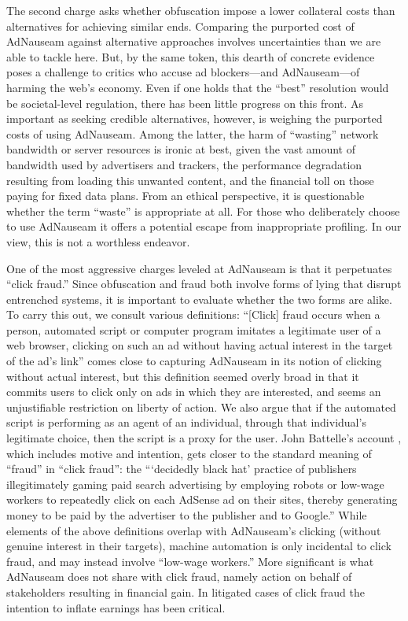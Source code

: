 \documentclass[conference]{IEEEtran}
\begin{document}
The second charge asks whether obfuscation impose a lower collateral costs than alternatives for achieving similar ends. Comparing the purported cost of AdNauseam against alternative approaches involves uncertainties than we are able to tackle here. But, by the same token, this dearth of concrete evidence poses a challenge to critics who accuse ad blockers---and AdNauseam---of harming the web's economy. Even if one holds that the “best” resolution would be societal-level regulation, there has been little progress on this front. As important as seeking credible alternatives, however, is weighing the purported costs of using AdNauseam. Among the latter, the harm of “wasting” network bandwidth or server resources is ironic at best, given the vast amount of bandwidth used by advertisers and trackers, the performance degradation resulting from loading this unwanted content, and the financial toll on those paying for fixed data plans. From an ethical perspective, it is questionable whether the term “waste” is appropriate at all. For those who deliberately choose to use AdNauseam it offers a potential escape from inappropriate profiling. In our view, this is not a worthless endeavor.

One of the most aggressive charges leveled at AdNauseam is that it perpetuates “click fraud.” Since obfuscation and fraud both involve forms of lying that disrupt entrenched systems, it is important to evaluate whether the two forms are alike. To carry this out, we consult various definitions: “[Click] fraud occurs when a person, automated script or computer program imitates a legitimate user of a web browser, clicking on such an ad without having actual interest in the target of the ad's link” \cite{Liu} comes close to capturing AdNauseam in its notion of clicking without actual interest, but this definition seemed overly broad in that it commits users to click only on ads in which they are interested, and seems an unjustifiable restriction on liberty of action. We also argue that if the automated script is performing as an agent of an individual, through that individual's legitimate choice, then the script is a proxy for the user. John Battelle's account \cite{Battelle}, which includes motive and intention, gets closer to the standard meaning of “fraud” in “click fraud”: the “‘decidedly black hat’ practice of publishers illegitimately gaming paid search advertising by employing robots or low-wage workers to repeatedly click on each AdSense ad on their sites, thereby generating money to be paid by the advertiser to the publisher and to Google.” While elements of the above definitions overlap with AdNauseam's clicking (without genuine interest in their targets), machine automation is only incidental to click fraud, and may instead involve “low-wage workers.” More significant is what AdNauseam does not share with click fraud, namely action on behalf of stakeholders resulting in financial gain. In litigated cases of click fraud the intention to inflate earnings has been critical.
\end{document}

